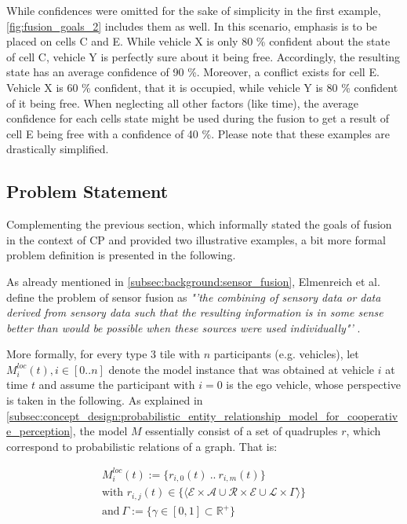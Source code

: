 While confidences were omitted for the sake of simplicity in the first example, \cref{fig:fusion_goals_2} includes them as well. In this scenario, emphasis is to be placed on cells C and E. While vehicle X is only 80 \% confident about the state of cell C, vehicle Y is perfectly sure about it being free. Accordingly, the resulting state has an average confidence of 90 \%. Moreover, a conflict exists for cell E. Vehicle X is 60 \% confident, that it is occupied, while vehicle Y is 80 \% confident of it being free. When neglecting all other factors (like time), the average confidence for each cells state might be used during the fusion to get a result of cell E being free with a confidence of 40 \%. Please note that these examples are drastically simplified.

\subsection{Problem Statement}
\label{subsec:concept_design:fusion_problem_statement}
Complementing the previous section, which informally stated the goals of fusion in the context of CP and provided two illustrative examples, a bit more formal problem definition is presented in the following.

As already mentioned in \cref{subsec:background:sensor_fusion}, Elmenreich et al. define the problem of sensor fusion as \textit{"'the combining of sensory data or data derived from sensory data such that the resulting information is in some sense better than would be possible when these sources were used individually"'} \cite{Elmenreich2002}.
\par
\bigskip

More formally, for every type 3 tile with $n$ participants (e.g. vehicles), let $M^{loc}_i(t), i \in [0..n]$ denote the model instance that was obtained at vehicle $i$ at time $t$ and assume the participant with $i = 0$ is the ego vehicle, whose perspective is taken in the following. As explained in \cref{subsec:concept_design:probabilistic_entity_relationship_model_for_cooperative_perception}, the model $M$ essentially consist of a set of quadruples $r$, which correspond to probabilistic relations of a graph. That is:

\begin{gather*}
	M^{loc}_i(t) := \{r_{i,0}(t) \ .. \ r_{i,m}(t)\} \\ 
	\text{with\ } r_{i,j}(t) \in \{ \langle \mathcal{E} \times \mathcal{A} \cup \mathcal{R} \times \mathcal{E} \cup \mathcal{L} \times \Gamma \rangle \} \\
	\text{and} \  \Gamma := \{ \gamma \in [0, 1] \subset \mathbb{R}^+ \} \\
\end{gather*}

